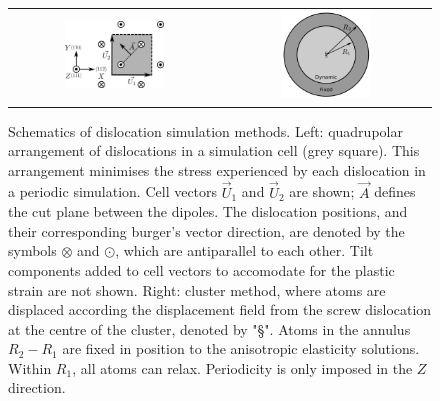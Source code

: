 \documentclass[a4paper,12pt,oneside,print,numbered,index,PageStyleIII]{PhDThesisPSnPDF}
\begin{document}
        \begin{figure}
    \begin{tabular}{cc}
	     \includegraphics[width=0.5\textwidth]{Images/s_arrangement_quadrupole.png} &
             \includegraphics[width=0.45\textwidth]{Images/cluster_method_schematic.png}  \\
    \end{tabular}
\caption{Schematics of dislocation simulation methods. Left: quadrupolar arrangement of dislocations in a simulation cell (grey square). This arrangement  minimises the stress experienced by each dislocation in a periodic simulation. Cell vectors $\vec{U}_1$ and $\vec{U}_2$ are shown; $\vec{A}$ defines the cut plane between the dipoles. The dislocation positions, and their corresponding burger's vector direction, are denoted by the symbols $\otimes$ and $\odot$, which are antiparallel to each other. Tilt components added to cell vectors to accomodate for the plastic strain are not shown. Right: cluster method, where atoms are displaced according the displacement field from the screw dislocation at the centre of the cluster, denoted by "\S". Atoms in the annulus $R_2 - R_1$ are fixed in position to the anisotropic elasticity solutions. Within $R_1$, all atoms can relax. Periodicity is only imposed in the $Z$ direction.}
	\label{fig:dislocationschematics}
    \end{figure}
\end{document}
